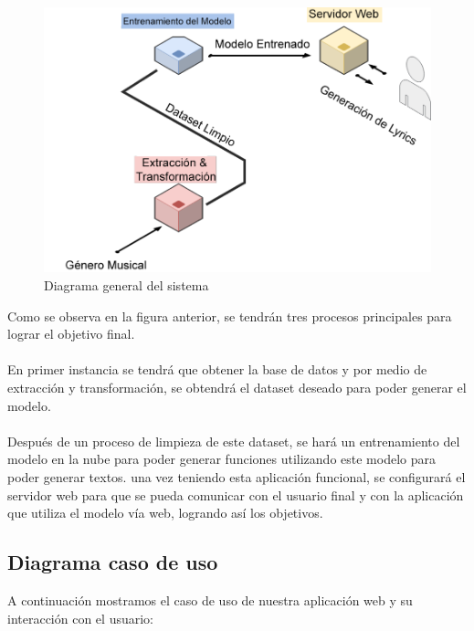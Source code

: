 \documentclass[12pt, a4paper, titlepage]{report}
\begin{document}
		\begin{figure}[H] 
			\includegraphics[scale=.4]{./imagenes/Disenio/Arquitectura/general.png}
			\caption{Diagrama general del sistema}
		\end{figure}
	Como se observa en la figura anterior, se tendrán tres procesos principales para lograr el objetivo final.\\\\
	En primer instancia se tendrá que obtener la base de datos y por medio de extracción y transformación, se obtendrá el dataset deseado para poder generar el modelo. \\\\
	Después de un proceso de limpieza de este dataset, se hará un entrenamiento del modelo en la nube para poder generar funciones utilizando este modelo para poder generar textos.
	una vez teniendo esta aplicación funcional, se configurará el servidor web para que se pueda comunicar con el usuario final y con la aplicación que utiliza el modelo vía web, logrando así los objetivos.
	\newpage
	
		\subsection{Diagrama caso de uso}
		
		A continuación mostramos el caso de uso de nuestra aplicación web y su interacción con el usuario:
		
\end{document}
